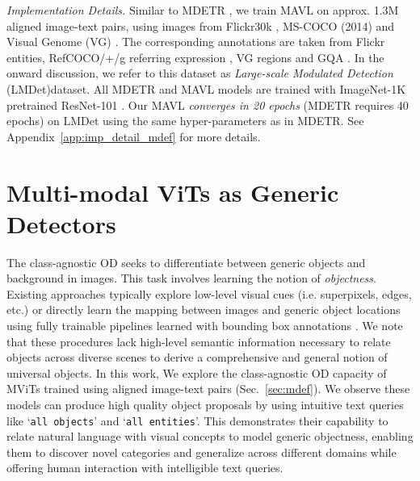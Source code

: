 \documentclass[runningheads]{llncs}
\newcommand{\txt}[1]{{\texttt{#1}}}
\begin{document}
\noindent
\textit{Implementation Details.}
Similar to MDETR \cite{mdetr}, we train MAVL on approx. 1.3M aligned image-text pairs, using
images from Flickr30k \cite{plummer2015flickr30k}, MS-COCO (2014) \cite{coco} and Visual Genome (VG) \cite{krishna2017visual}. The corresponding annotations are taken from Flickr entities, RefCOCO/+/g referring expression \cite{kazemzadeh2014referitgame}, VG regions and GQA \cite{hudson2019gqa}. In the onward discussion, we refer to this dataset as \emph{Large-scale Modulated Detection} ({LMDet})dataset.
All MDETR and MAVL models are trained with ImageNet-1K \cite{russakovsky2015imagenet} pretrained ResNet-101 \cite{he2016deep}.
Our MAVL \emph{converges in 20 epochs} (MDETR requires 40 epochs) on LMDet using the same hyper-parameters as in MDETR. See Appendix~\ref{app:imp_detail_mdef} for more details.


\section{Multi-modal ViTs as Generic Detectors}\label{sec:multi-modal}
The class-agnostic OD seeks to differentiate between generic objects and background in images. This task involves learning the notion of \emph{objectness}. Existing approaches typically explore low-level visual cues
(i.e. superpixels, edges, etc.) or directly learn the mapping between images and generic object locations using fully trainable pipelines learned with bounding box annotations \cite{uijlings2013selective,zitnick2014edge,jaiswal2021class,detreg}. We note that these procedures lack high-level semantic information necessary to relate objects across diverse scenes to derive a comprehensive and general notion of universal objects. In this work, 
We explore the class-agnostic OD capacity of MViTs trained using aligned image-text pairs (Sec.~\ref{sec:mdef}).  We observe these models can produce high quality object proposals by using intuitive text queries like ‘\txt{all objects}’ and ‘\txt{all entities}’. This demonstrates  their capability to relate natural language with visual concepts to model generic objectness, enabling them to discover novel categories and generalize across different domains while offering human interaction with intelligible text queries.
\end{document}
